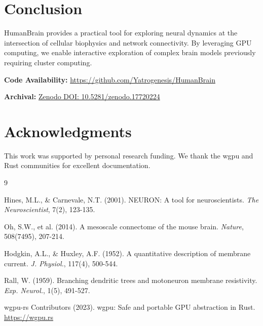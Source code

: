 \documentclass[11pt,twocolumn]{article}
\begin{document}
\section{Conclusion}

HumanBrain provides a practical tool for exploring neural dynamics at the intersection of cellular biophysics and network connectivity. By leveraging GPU computing, we enable interactive exploration of complex brain models previously requiring cluster computing.

\textbf{Code Availability:} \url{https://github.com/Yatrogenesis/HumanBrain}

\textbf{Archival:} \href{https://doi.org/10.5281/zenodo.17720224}{Zenodo DOI: 10.5281/zenodo.17720224}

\section*{Acknowledgments}
This work was supported by personal research funding. We thank the wgpu and Rust communities for excellent documentation.

\begin{thebibliography}{9}

Hines, M.L., \& Carnevale, N.T. (2001).
NEURON: A tool for neuroscientists.
\textit{The Neuroscientist}, 7(2), 123-135.

Oh, S.W., et al. (2014).
A mesoscale connectome of the mouse brain.
\textit{Nature}, 508(7495), 207-214.

Hodgkin, A.L., \& Huxley, A.F. (1952).
A quantitative description of membrane current.
\textit{J. Physiol.}, 117(4), 500-544.

Rall, W. (1959).
Branching dendritic trees and motoneuron membrane resistivity.
\textit{Exp. Neurol.}, 1(5), 491-527.

wgpu-rs Contributors (2023).
wgpu: Safe and portable GPU abstraction in Rust.
\url{https://wgpu.rs}

\end{thebibliography}
\end{document}
